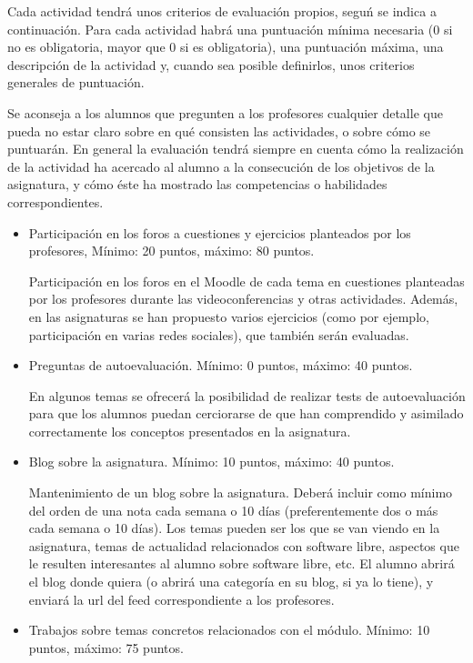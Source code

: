 \documentclass[a4paper,12pt]{article}
\begin{document}
Cada actividad tendrá unos criterios de evaluación propios, seguń se indica a continuación. Para cada actividad habrá una puntuación mínima necesaria (0 si no es obligatoria, mayor que 0 si es obligatoria), una puntuación máxima, una descripción de la actividad y, cuando sea posible definirlos, unos criterios generales de puntuación.

Se aconseja a los alumnos que pregunten a los profesores cualquier detalle que pueda no estar claro sobre en qué consisten las actividades, o sobre cómo se puntuarán. En general la evaluación tendrá siempre en cuenta cómo la realización de la actividad ha acercado al alumno a la consecución de los objetivos de la asignatura, y cómo éste ha mostrado las competencias o habilidades correspondientes.

\begin{itemize}
\item Participación en los foros a cuestiones y ejercicios planteados por los profesores,  Mínimo: 20 puntos, máximo: 80 puntos.

Participación en los foros en el Moodle de cada tema en cuestiones planteadas por los profesores durante las videoconferencias y otras actividades. Además, en las asignaturas se han propuesto varios ejercicios (como por ejemplo, participación en varias redes sociales), que también serán evaluadas.

\item Preguntas de autoevaluación. Mínimo: 0 puntos, máximo: 40 puntos.

En algunos temas se ofrecerá la posibilidad de realizar tests de autoevaluación para que los alumnos puedan cerciorarse de que han comprendido y asimilado correctamente los conceptos presentados en la asignatura.

\item Blog sobre la asignatura. Mínimo: 10 puntos, máximo: 40 puntos.

Mantenimiento de un blog sobre la asignatura. Deberá incluir como mínimo del orden de una nota cada semana o 10 días (preferentemente dos o más cada semana o 10 días). Los temas pueden ser los que se van viendo en la asignatura, temas de actualidad relacionados con software libre, aspectos que le resulten interesantes al alumno sobre software libre, etc. El alumno abrirá el blog donde quiera (o abrirá una categoría en su blog, si ya lo tiene), y enviará la url del feed correspondiente a los profesores.


\item Trabajos sobre temas concretos relacionados con el módulo. Mínimo: 10 puntos, máximo: 75 puntos.


\end{itemize}
\end{document}
